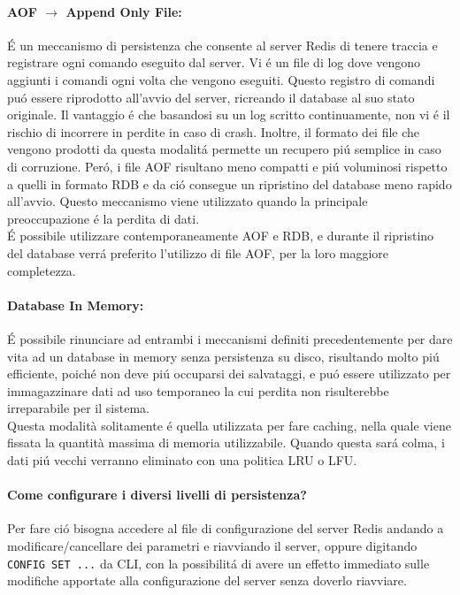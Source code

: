 \begin{itemize}
    \paragraph{AOF $\to$ Append Only File:}
    É un meccanismo di persistenza che consente al server Redis di tenere traccia e registrare ogni comando eseguito dal server.
    Vi é un file di log dove vengono aggiunti i comandi ogni volta che vengono eseguiti.
    Questo registro di comandi puó essere riprodotto all'avvio del server, ricreando il database al suo stato originale.
    Il vantaggio é che basandosi su un log scritto continuamente, non vi é il rischio di incorrere in perdite in caso di crash. Inoltre,
    il formato dei file che vengono prodotti da questa modalitá permette un recupero piú semplice in caso di corruzione.
    Peró, i file AOF risultano meno compatti e piú voluminosi rispetto a quelli in formato RDB e da ció consegue un ripristino del database
    meno rapido all'avvio. Questo meccanismo viene utilizzato quando la principale preoccupazione é la perdita di dati.\\

    É possibile utilizzare contemporaneamente AOF e RDB, e durante il ripristino del database verrá preferito l'utilizzo di file AOF, per la loro
    maggiore completezza.


    \paragraph{Database In Memory:}
    É possibile rinunciare ad entrambi i meccanismi definiti precedentemente per dare vita ad un database in memory senza persistenza su disco, risultando molto piú
    efficiente, poiché non deve piú occuparsi dei salvataggi, e puó essere utilizzato per immagazzinare dati ad uso temporaneo la cui
    perdita non risulterebbe irreparabile per il sistema.\\
    Questa modalità solitamente é quella utilizzata per fare caching, nella quale viene fissata la quantità massima di memoria utilizzabile. Quando questa sará
    colma, i dati piú vecchi verranno eliminato con una politica LRU o LFU.
\end{itemize}

\paragraph{Come configurare i diversi livelli di persistenza?\\}
Per fare ció bisogna accedere al file di configurazione del server Redis andando a modificare/cancellare dei parametri e riavviando il server,
oppure digitando \texttt{CONFIG SET ...} da CLI, con la possibilitá di avere un effetto immediato sulle modifiche apportate alla configurazione del server senza doverlo riavviare.\\

